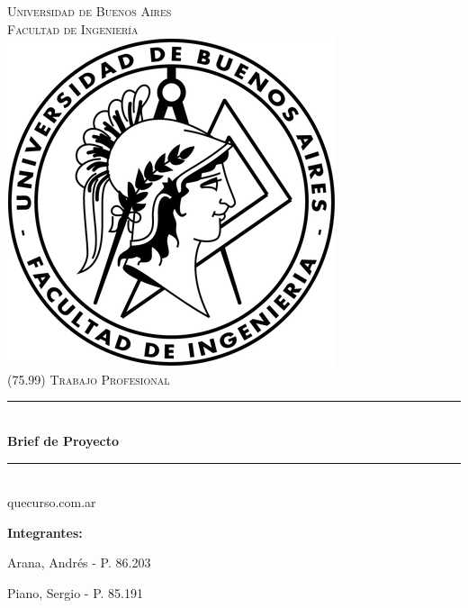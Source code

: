 \documentclass[a4paper,11pt]{article}
\begin{document}

\thispagestyle{empty}

\begin{titlepage}

\newcommand{\HRule}{\rule{\linewidth}{0.5mm}}
\newenvironment{bottompar}{\par\vspace*{\fill}}{\clearpage}

\center

\textsc{\LARGE Universidad de Buenos Aires}\\[0.5cm]
\textsc{\Large Facultad de Ingeniería}\\[1.5cm]

\includegraphics[scale=0.5]{src/common/logo.png}\\[1cm]


\textsc{\large (75.99) Trabajo Profesional}\\[0.25cm]
\HRule \\[0.4cm]
{\huge \bfseries Brief de Proyecto}
\HRule \\[0.4cm]

{\large quecurso.com.ar}

\begin{bottompar}
\flushleft
{\bfseries Integrantes:}

Arana, Andrés          - P. 86.203

Piano, Sergio          - P. 85.191
\end{bottompar}

\end{titlepage}
\end{document}
